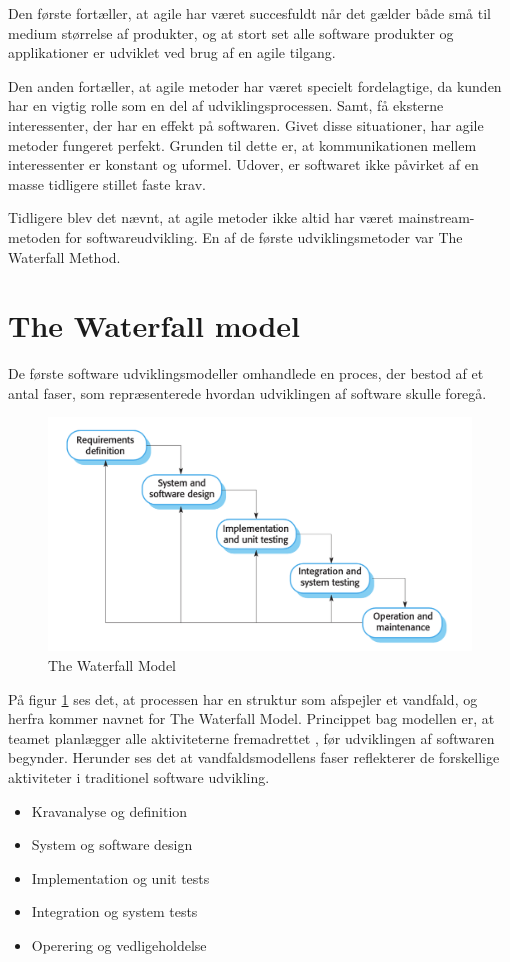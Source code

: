 Den første fortæller, at agile har været succesfuldt når det gælder både små til medium størrelse af produkter, og at stort set alle software produkter og applikationer er udviklet ved brug af en agile tilgang.

Den anden fortæller, at agile metoder har været specielt fordelagtige, da kunden har en vigtig rolle som en del af udviklingsprocessen. Samt, få eksterne interessenter, der har en effekt på softwaren. \cite{Sommerville}
Givet disse situationer, har agile metoder fungeret perfekt. Grunden til dette er, at kommunikationen mellem interessenter er konstant og uformel. Udover, er softwaret ikke påvirket af en masse tidligere stillet faste krav.

Tidligere blev det nævnt, at agile metoder ikke altid har været mainstream-metoden for softwareudvikling. En af de første udviklingsmetoder var The Waterfall Method.

\section{The Waterfall model}
De første software udviklingsmodeller omhandlede en proces, der bestod af et antal faser, som repræsenterede hvordan udviklingen af software skulle foregå. \cite{Sommerville}

\begin{figure}
    \includegraphics[width=\linewidth]{figures/waterfall_model.png}
    \caption{The Waterfall Model}
    \label{fig:waterfall}
\end{figure}

På figur \ref{fig:waterfall} ses det, at processen har en struktur som afspejler et vandfald, og herfra kommer navnet for The Waterfall Model. Princippet bag modellen er, at teamet planlægger alle aktiviteterne fremadrettet , før udviklingen af softwaren begynder. Herunder ses det at vandfaldsmodellens faser reflekterer de forskellige aktiviteter i traditionel software udvikling. \cite{Sommerville}
\begin{itemize}
    \item Kravanalyse og definition
    \item System og software design
    \item Implementation og unit tests
    \item Integration og system tests
    \item Operering og vedligeholdelse %
\end{itemize}

